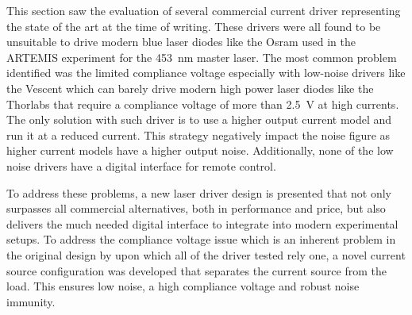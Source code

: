 This section saw the evaluation of several commercial current driver representing the state of the art at the time of writing. These drivers were all found to be unsuitable to drive modern blue laser diodes like the Osram  \cite{datasheet_osram_pl450b} used in the ARTEMIS experiment for the \qty{453}{\nm} master laser. The most common problem identified was the limited compliance voltage especially with low-noise drivers like the Vescent  which can barely drive modern high power laser diodes like the Thorlabs  \cite{datasheet_thorlabs_780nm} that require a compliance voltage of more than \qty{2.5}{\V} at high currents. The only solution with such driver is to use a higher output current model and run it at a reduced current. This strategy negatively impact the noise figure as higher current models have a higher output noise. Additionally, none of the low noise drivers have a digital interface for remote control.

To address these problems, a new laser driver design is presented that not only surpasses all commercial alternatives, both in performance and price, but also delivers the much needed digital interface to integrate into modern experimental setups. To address the compliance voltage issue which is an inherent problem in the original design by \citeauthor{libbrecht_hall} \cite{libbrecht_hall} upon which all of the driver tested rely one, a novel current source configuration was developed that separates the current source from the load. This ensures low noise, a high compliance voltage and robust noise immunity.

